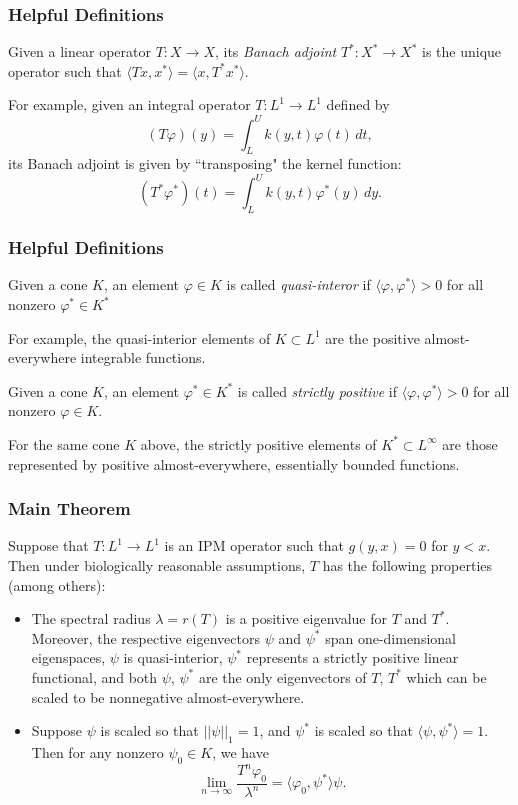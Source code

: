 \documentclass{beamer}
\begin{document}
\begin{frame}
	\frametitle{Helpful Definitions}
		\begin{definition}
			Given a linear operator $T:X \to X$, its \emph{Banach adjoint} $T^*:X^* \to X^*$ is the unique operator such that $\langle Tx, x^* \rangle = \langle x, T^*x^* \rangle$. 
		\end{definition}
	\pause
	For example, given an integral operator $T:L^1 \to L^1$ defined by
	\[(T\varphi)(y) = \int_L^U k(y, t) \varphi(t) \, dt,\]
	\pause
	its Banach adjoint is given by ``transposing" the kernel function:
	\[(T^*\varphi^*)(t) = \int_L^U k(y, t)\varphi^*(y) \, dy.\]
\end{frame}

\begin{frame}
	\frametitle{Helpful Definitions}
		\begin{definition}
			Given a cone $K$, an element $\varphi \in K$ is called \emph{quasi-interor} if $\langle \varphi, \varphi^* \rangle >0$ for all nonzero $\varphi^* \in K^*$
		\end{definition}
		\pause
		For example, the quasi-interior elements of $K \subset L^1$ are the positive almost-everywhere integrable functions.
		\pause
		\begin{definition}
			Given a cone $K$, an element $\varphi^* \in K^*$ is called \emph{strictly positive} if $\langle \varphi, \varphi^* \rangle > 0$ for all nonzero $\varphi \in K$.
		\end{definition}
		\pause
		For the same cone $K$ above, the strictly positive elements of $K^* \subset L^\infty$ are those represented by positive almost-everywhere, essentially bounded functions.
\end{frame}

\begin{frame}
	\frametitle{Main Theorem}
	\begin{theorem}[R., 2020]
		Suppose that $T:L^1 \to L^1$ is an IPM operator such that $g(y, x) = 0$ for $y < x$. Then under biologically reasonable assumptions, $T$ has the following properties (among others):
		\pause
		\begin{itemize}
			\item The spectral radius $\lambda = r(T)$ is a positive eigenvalue for $T$ and $T^*$. Moreover, the respective eigenvectors $\psi$ and $\psi^*$ span one-dimensional eigenspaces, $\psi$ is quasi-interior, $\psi^*$ represents a strictly positive linear functional, and both $\psi$, $\psi^*$ are the only eigenvectors of $T$, $T^*$ which can be scaled to be nonnegative almost-everywhere.
			\pause
			\item Suppose $\psi$ is scaled so that $||\psi||_1 = 1$, and $\psi^*$ is scaled so that $\langle \psi, \psi^* \rangle = 1$. Then for any nonzero $\psi_0 \in K$, we have
			\[\lim_{n \to \infty} \frac{T^n \varphi_0}{\lambda^n} = \langle \varphi_0, \psi^* \rangle \psi.\]			
		\end{itemize}
	\end{theorem}
\end{frame}
\end{document}
